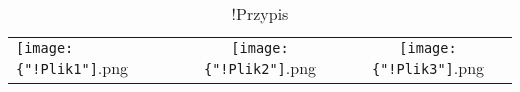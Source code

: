 \begin{table}[h]
\begin{tabularx}{1\textwidth}{@{\hspace{1.7 mm}}Xcc@{\hspace{1.7 mm}}}
\texttt{[image: \{"!Plik1"]}.png}
&
\texttt{[image: \{"!Plik2"]}.png}
&
\texttt{[image: \{"!Plik3"]}.png}  \\
\end{tabularx}
\caption{!Przypis}
\end{table}
